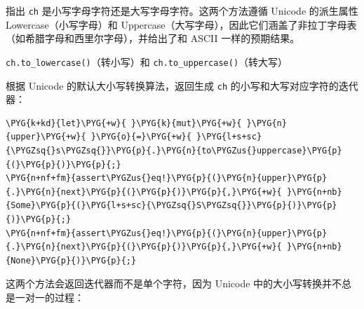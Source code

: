 指出 \texttt{ch} 是小写字母字符还是大写字母字符。这两个方法遵循 Unicode 的派生属性 Lowercase（小写字母）和 Uppercase（大写字母），因此它们涵盖了非拉丁字母表（如希腊字母和西里尔字母），并给出了和 ASCII 一样的预期结果。

\begin{myNote}
\texttt{ch.to\_lowercase()}（转小写）和 \texttt{ch.to\_uppercase()}（转大写）
\end{myNote}

根据 Unicode 的默认大小写转换算法，返回生成 \texttt{ch} 的小写和大写对应字符的迭代器：

\begin{Verbatim}[commandchars=\\\{\},breaklines=true,breakanywhere=true,fontsize=\codefont,xleftmargin=17bp]
\PYG{k+kd}{let}\PYG{+w}{ }\PYG{k}{mut}\PYG{+w}{ }\PYG{n}{upper}\PYG{+w}{ }\PYG{o}{=}\PYG{+w}{ }\PYG{l+s+sc}{\PYGZsq{}s\PYGZsq{}}\PYG{p}{.}\PYG{n}{to\PYGZus{}uppercase}\PYG{p}{(}\PYG{p}{)}\PYG{p}{;}
\PYG{n+nf+fm}{assert\PYGZus{}eq!}\PYG{p}{(}\PYG{n}{upper}\PYG{p}{.}\PYG{n}{next}\PYG{p}{(}\PYG{p}{)}\PYG{p}{,}\PYG{+w}{ }\PYG{n+nb}{Some}\PYG{p}{(}\PYG{l+s+sc}{\PYGZsq{}S\PYGZsq{}}\PYG{p}{)}\PYG{p}{)}\PYG{p}{;}
\PYG{n+nf+fm}{assert\PYGZus{}eq!}\PYG{p}{(}\PYG{n}{upper}\PYG{p}{.}\PYG{n}{next}\PYG{p}{(}\PYG{p}{)}\PYG{p}{,}\PYG{+w}{ }\PYG{n+nb}{None}\PYG{p}{)}\PYG{p}{;}
\end{Verbatim}

这两个方法会返回迭代器而不是单个字符，因为 Unicode 中的大小写转换并不总是一对一的过程：


